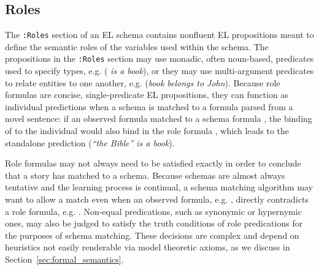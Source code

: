 \subsection{Roles}
\label{sec:roles}
The \texttt{:Roles} section of an EL schema contains nonfluent EL propositions meant to define the semantic roles of the variables used within the schema.
The propositions in the \texttt{:Roles} section may use monadic, often noun-based, predicates used to specify types, e.g.  ( \textit{is a book}), or they may use multi-argument predicates to relate entities to one another, e.g.  (\textit{book}  \textit{belongs to John}).
Because role formulas are concise, single-predicate EL propositions, they can function as individual predictions when a schema is matched to a formula parsed from a novel sentence: if an observed formula  matched to a schema formula , the binding of  to the individual  would also bind  in the role formula , which leads to the standalone prediction  (\textit{``the Bible'' is a book}).

Role formulas may not always need to be satisfied exactly in order to conclude that a story has matched to a schema.
Because schemas are almost always tentative and the learning process is continual, a schema matching algorithm may want to allow a match even when an observed formula, e.g. , directly contradicts a role formula, e.g. .
Non-equal predications, such as synonymic or hypernymic ones, may also be judged to satisfy the truth conditions of role predications for the purposes of schema matching.
These decisions are complex and depend on heuristics not easily renderable via model theoretic axioms, as we discuss in Section~\ref{sec:formal_semantics}.


